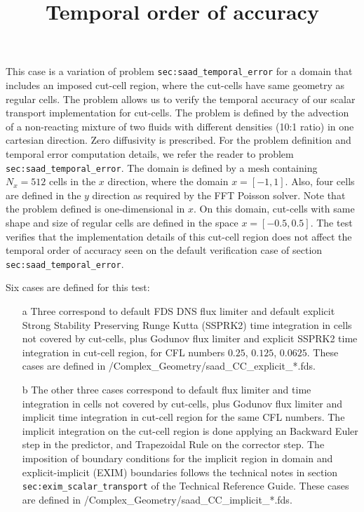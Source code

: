 \documentclass[12pt]{article}
\begin{document}
This case is a variation of problem \texttt{sec:saad\_temporal\_error} for a domain that includes an imposed cut-cell region, where the cut-cells have same geometry as regular cells. The problem allows us to verify the temporal accuracy of our scalar transport implementation for cut-cells. The problem is defined by the advection of a non-reacting mixture of two fluids with different densities (10:1 ratio) in one cartesian direction. Zero diffusivity is prescribed. For the problem definition and temporal error computation details, we refer the reader to problem \texttt{sec:saad\_temporal\_error}.
The domain is defined by a mesh containing $N_x=512$ cells in the $x$ direction, where the domain $x=[-1,1]$. Also, four cells are defined in the $y$ direction as required by the FFT Poisson solver. Note that the problem defined is one-dimensional in $x$.
On this domain, cut-cells with same shape and size of regular cells are defined in the space $x=[-0.5,0.5]$. The test verifies that the implementation details of this cut-cell region does not affect the temporal order of accuracy seen on the default verification case of section \texttt{sec:saad\_temporal\_error}.

\title{Temporal order of accuracy}

Six cases are defined for this test:
%
\begin{enumerate}
 \item[a]  Three correspond to default FDS DNS flux limiter and default explicit Strong Stability Preserving Runge Kutta (SSPRK2) time integration in cells not covered by cut-cells, plus Godunov flux limiter and explicit SSPRK2 time integration in cut-cell region, for CFL numbers $0.25$, $0.125$, $0.0625$. These cases are defined in {\ct /Complex\_Geometry/saad\_CC\_explicit\_*.fds}.

  \item[b] The other three cases correspond to default flux limiter and time integration in cells not covered by cut-cells, plus Godunov flux limiter and implicit time integration in cut-cell region for the same CFL numbers. The implicit integration on the cut-cell region is done applying an Backward Euler step in the predictor, and Trapezoidal Rule on the corrector step. The imposition of boundary conditions for the implicit region in domain and explicit-implicit (EXIM) boundaries follows the technical notes in section \texttt{sec:exim\_scalar\_transport} of the Technical Reference Guide. These cases are defined in {\ct /Complex\_Geometry/saad\_CC\_implicit\_*.fds}.

\end{enumerate}
%
\end{document}
